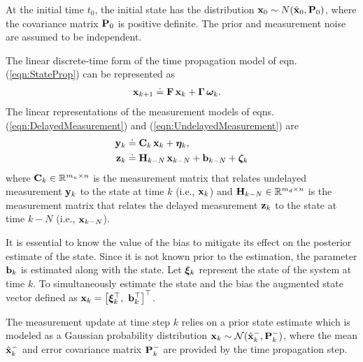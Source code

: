 At the initial time $t_0$, the initial state has the distribution $\mathbf{x}_0\sim N(\hat{\mathbf{x}}_0,\mathbf{P}_0)$, where the covariance matrix $\mathbf{P}_0$ is positive definite.
The prior and measurement noise are assumed to be independent.

The linear discrete-time form of the time propagation model of eqn. (\ref{eqn:StateProp}) can be represented as
\begin{align}
	\label{eqn:LinearStateProp}
	\mathbf{x}_{k+1} &\doteq \mathbf{F} \, \mathbf{x}_k + \boldsymbol{\Gamma} \, \boldsymbol{\omega}_k.
\end{align}
The linear representations of the measurement models of eqns. (\ref{eqn:DelayedMeasurement}) and (\ref{eqn:UndelayedMeasurement}) are
\begin{align}
	\label{eqn:LinearUndelayedMeasurement}
	\mathbf{y}_k &\doteq \mathbf{C}_k \, \mathbf{x}_k + \boldsymbol{\eta}_k, \\ \label{eqn:LinearDelayedMeasurement}
	\mathbf{z}_k &\doteq \mathbf{H}_{k-N} \, \mathbf{x}_{k-N} + \mathbf{b}_{k-N} +\boldsymbol{\zeta}_k 
\end{align}
where 
$\mathbf{C}_k\in \mathbb{R}^{m_u \times n}$ is the measurement matrix that relates undelayed measurement $\mathbf{y}_k$ to the state at time $k$ (i.e., $\mathbf{x}_k$)
and
$\mathbf{H}_{k-N} \in \mathbb{R}^{m_d \times n}$ is the measurement matrix that relates the delayed measurement $\mathbf{z}_{k}$ to the state at time $k-N$ (i.e., $\mathbf{x}_{k-N}$).

It is essential to know the value of the bias to mitigate its effect on the posterior estimate of the state. 
Since it is not known prior to the estimation, the parameter $\mathbf{b}_k$ is estimated along with the state. 
Let $\boldsymbol{\xi}_k$ represent the state of the system at time $k$.
To simultaneously estimate the state and the bias the augmented state vector defined as 
$\mathbf{x}_k =	\big[\boldsymbol{\xi}_k^\top, ~\mathbf{b}_k^\top \big]^\top$.

The measurement update at time step $k$ relies on a  prior state estimate which is modeled as a Gaussian probability distribution $\mathbf{x}_k \sim \mathcal{N}(\hat{\mathbf{x}}_k^-,\mathbf{P}_k^-)$, where the mean $\hat{\mathbf{x}}_k^-$ and error covariance matrix $\mathbf{P}_k^-$ are provided by the time propagation step.


